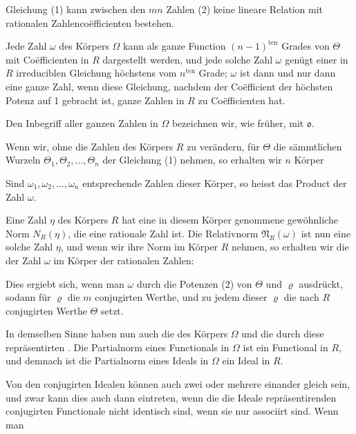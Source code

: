 Gleichung (1) kann zwischen den $mn$ Zahlen (2) keine lineare Relation mit rationalen Zahlencoëfficienten bestehen.

Jede Zahl $\omega$ des K\"orpers $\Omega$ kann als ganze Function $(n-1)^{\text{ten}}$ Grades von $\Theta$ mit Coëfficienten in $R$ dargestellt werden, und jede solche Zahl $\omega$ gen\"ugt einer in $R$ irreduciblen Gleichung h\"ochstens vom $n^{\text{ten}}$ Grade; $\omega$ ist dann und nur dann eine ganze Zahl, wenn diese Gleichung, nachdem der Coëfficient der h\"ochsten Potenz auf 1 gebracht ist, ganze Zahlen in $R$ zu Coëfficienten hat.

Den Inbegriff aller ganzen Zahlen in $\Omega$ bezeichnen wir, wie fr\"uher, mit $\mathfrak{o}$.

Wenn wir, ohne die Zahlen des K\"orpers $R$ zu ver\"andern, f\"ur $\Theta$ die s\"ammtlichen Wurzeln $\Theta_1, \Theta_2, \ldots, \Theta_n$ der Gleichung (1) nehmen, so erhalten wir $n$ K\"orper

Sind $\omega_1, \omega_2, \ldots, \omega_n$ entsprechende Zahlen dieser K\"orper, so heisst das Product
 der Zahl $\omega$.

Eine Zahl $\eta$ des K\"orpers $R$ hat eine in diesem K\"orper genommene gew\"ohnliche Norm $N_R(\eta)$, die eine rationale Zahl ist. Die Relativnorm $\mathfrak{N}_R(\omega)$ ist nun eine solche Zahl $\eta$, und wenn wir ihre Norm im K\"orper $R$ nehmen, so erhalten wir die  der Zahl $\omega$ im K\"orper der rationalen Zahlen:

Dies ergiebt sich, wenn man $\omega$ durch die Potenzen (2) von $\Theta$ und $\varrho$ ausdr\"uckt, sodann f\"ur $\varrho$ die $m$ conjugirten Werthe, und zu jedem dieser $\varrho$ die nach $R$ conjugirten Werthe $\Theta$ setzt.

In demselben Sinne haben nun auch die  des K\"orpers $\Omega$ und die durch diese repr\"asentirten . Die Partialnorm eines Functionals in $\Omega$ ist ein Functional in $R$, und demnach ist die Partialnorm eines Ideals in $\Omega$ ein Ideal in $R$.

Von den conjugirten Idealen k\"onnen auch zwei oder mehrere einander gleich sein, und zwar kann dies auch dann eintreten, wenn die die Ideale repr\"asentirenden conjugirten Functionale nicht identisch sind, wenn sie nur associirt sind. Wenn man

